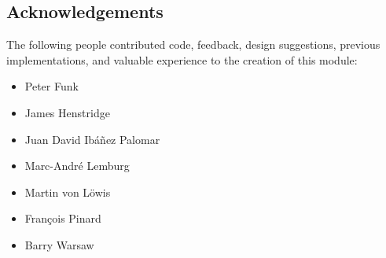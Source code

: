 \subsection{Acknowledgements}

The following people contributed code, feedback, design suggestions,
previous implementations, and valuable experience to the creation of
this module:

\begin{itemize}
    \item Peter Funk
    \item James Henstridge
    \item Juan David Ib\'a\~nez Palomar
    \item Marc-Andr\'e Lemburg
    \item Martin von L\"owis
    \item Fran\c cois Pinard
    \item Barry Warsaw
\end{itemize}
